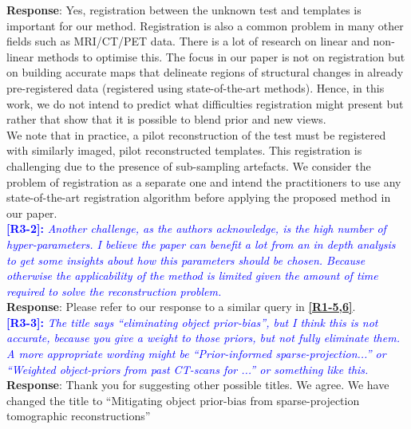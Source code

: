 \documentclass[11pt]{article}
\begin{document}
\textbf{Response}: Yes, registration between the unknown test and templates is important for our method. Registration is also a common problem in many other fields such as MRI/CT/PET data.  There is a lot of research on linear and non-linear methods to optimise this. The focus in our paper is not on registration but on building accurate maps that delineate regions of structural changes in already pre-registered data (registered using state-of-the-art methods).  Hence, in this work, we do not intend to predict what difficulties registration might present but rather that show that it is possible to blend prior and new views.\\

We note that in practice, a pilot reconstruction of the test must be registered with similarly imaged, pilot reconstructed templates. This registration is challenging due to the presence of sub-sampling artefacts. We consider the problem of registration as a separate one and intend the practitioners to use any state-of-the-art registration algorithm before applying the proposed method in our paper. 
\\

\vspace{0.5cm}\textcolor{blue}{\textbf{[R3-2]:} \textit{Another challenge, as the authors acknowledge, is the high number of hyper-parameters. I believe the paper can benefit a lot from an in depth analysis to get some insights about how this parameters should be chosen. Because otherwise the applicability of the method is limited given the amount of time required to solve the reconstruction problem.
}}\\

\textbf{Response}: Please refer to our response to a similar query in \textcolor{blue}{\textbf{\hyperlink{hyperparameters}{[R1-5,6]}}}.\\


\vspace{0.5cm}\textcolor{blue}{\textbf{[R3-3]:} \textit{The title says ``eliminating object prior-bias'', but I think this is not accurate, because you give a weight to those priors, but not fully eliminate them. A more appropriate wording might be ``Prior-informed sparse-projection...'' or ``Weighted object-priors from past CT-scans for ...'' or something like this.}}\\

\textbf{Response}: Thank you for suggesting other possible titles. We
agree. We have changed the title to ``Mitigating object prior-bias from sparse-projection tomographic reconstructions''\\
\end{document}
